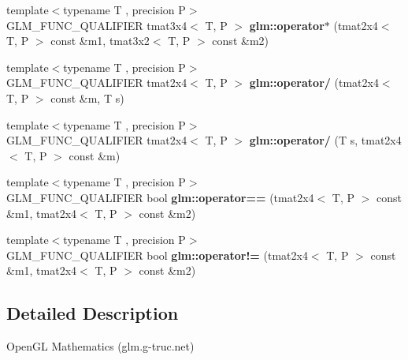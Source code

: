 \begin{DoxyCompactItemize}
\item 
\hypertarget{namespaceglm_a74224d12bdf4aebfe9005cf41e80ef7c}{{\footnotesize template$<$typename T , precision P$>$ }\\G\-L\-M\-\_\-\-F\-U\-N\-C\-\_\-\-Q\-U\-A\-L\-I\-F\-I\-E\-R tmat3x4$<$ T, P $>$ {\bfseries glm\-::operator$\ast$} (tmat2x4$<$ T, P $>$ const \&m1, tmat3x2$<$ T, P $>$ const \&m2)}\label{namespaceglm_a74224d12bdf4aebfe9005cf41e80ef7c}

\item 
\hypertarget{namespaceglm_a078ecb1b9db9902dc87f37dc86a56f38}{{\footnotesize template$<$typename T , precision P$>$ }\\G\-L\-M\-\_\-\-F\-U\-N\-C\-\_\-\-Q\-U\-A\-L\-I\-F\-I\-E\-R tmat2x4$<$ T, P $>$ {\bfseries glm\-::operator/} (tmat2x4$<$ T, P $>$ const \&m, T s)}\label{namespaceglm_a078ecb1b9db9902dc87f37dc86a56f38}

\item 
\hypertarget{namespaceglm_ad762e815816d483608530235166df211}{{\footnotesize template$<$typename T , precision P$>$ }\\G\-L\-M\-\_\-\-F\-U\-N\-C\-\_\-\-Q\-U\-A\-L\-I\-F\-I\-E\-R tmat2x4$<$ T, P $>$ {\bfseries glm\-::operator/} (T s, tmat2x4$<$ T, P $>$ const \&m)}\label{namespaceglm_ad762e815816d483608530235166df211}

\item 
\hypertarget{namespaceglm_acf9efbc338894088f7ca5419c6a0cf81}{{\footnotesize template$<$typename T , precision P$>$ }\\G\-L\-M\-\_\-\-F\-U\-N\-C\-\_\-\-Q\-U\-A\-L\-I\-F\-I\-E\-R bool {\bfseries glm\-::operator==} (tmat2x4$<$ T, P $>$ const \&m1, tmat2x4$<$ T, P $>$ const \&m2)}\label{namespaceglm_acf9efbc338894088f7ca5419c6a0cf81}

\item 
\hypertarget{namespaceglm_a979ffc34e33d3dd7ca8375b30c021384}{{\footnotesize template$<$typename T , precision P$>$ }\\G\-L\-M\-\_\-\-F\-U\-N\-C\-\_\-\-Q\-U\-A\-L\-I\-F\-I\-E\-R bool {\bfseries glm\-::operator!=} (tmat2x4$<$ T, P $>$ const \&m1, tmat2x4$<$ T, P $>$ const \&m2)}\label{namespaceglm_a979ffc34e33d3dd7ca8375b30c021384}

\end{DoxyCompactItemize}


\subsection{Detailed Description}
Open\-G\-L Mathematics (glm.\-g-\/truc.\-net)

